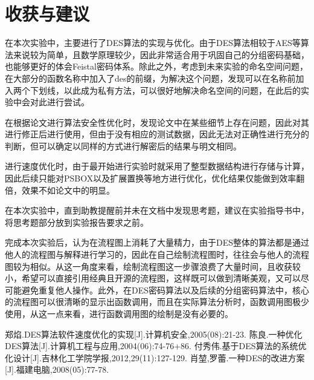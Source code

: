 \documentclass[a4paper, zihao=-4, UTF-8]{ctexart}
\begin{document}
		\section{收获与建议}
		在本次实验中，主要进行了DES算法的实现与优化。由于DES算法相较于AES等算法来说较为简单，且数学原理较少，因此非常适合用于巩固自己的分组密码基础，也能够更好的体会Feistal密码体系。除此之外，考虑到未来实验的命名空间问题，在大部分的函数名称中加入了des的前缀，为解决这个问题，发现可以在名称前加入两个下划线，以此成为私有方法，可以很好地解决命名空间的问题，在此后的实验中会对此进行尝试。
		\par 在根据论文进行算法安全性优化时，发现论文中在某些细节上存在问题，因此对其进行修正后进行使用，但由于没有相应的测试数据，因此无法对正确性进行充分的判断，但可以确定以同样的方式进行解密后的结果与明文相同。
		\par 进行速度优化时，由于最开始进行实验时就采用了整型数据结构进行存储与计算，因此后续只能对PSBOX以及扩展置换等地方进行优化，优化结果仅能做到效率翻倍，效果不如论文中的明显。
		\par 在本次实验中，直到助教提醒前并未在文档中发现思考题，建议在实验指导书中，将思考题部分放到实验报告要求之前。
		\par 完成本次实验后，认为在流程图上消耗了大量精力，由于DES整体的算法都是通过他人的流程图与解释进行学习的，因此在自己绘制流程图时，往往会与他人的流程图较为相似。从这一角度来看，绘制流程图这一步骤浪费了大量时间，且收获较小，希望可以直接引用经典且开源的流程图，这样既可以做到清晰美观，又可以尽可能避免重复他人操作。此外，在DES密码算法以及后续的分组密码算法中，核心的流程图可以很清晰的显示出函数调用，而且在实际算法分析时，函数调用图极少使用，从这一点来看，进行函数调用图的绘制是没有必要的。
    \begin{thebibliography}{99}
		郑焰.DES算法软件速度优化的实现[J].计算机安全,2005(08):21-23.
		陈良.一种优化DES算法[J].计算机工程与应用,2004(06):74-76+86.
		付秀伟.基于DES算法的系统优化设计[J].吉林化工学院学报,2012,29(11):127-129.
		肖堃,罗蕾.一种DES的改进方案[J].福建电脑,2008(05):77-78.
	\end{thebibliography}
	\newpage
	\appendix
\end{document}

